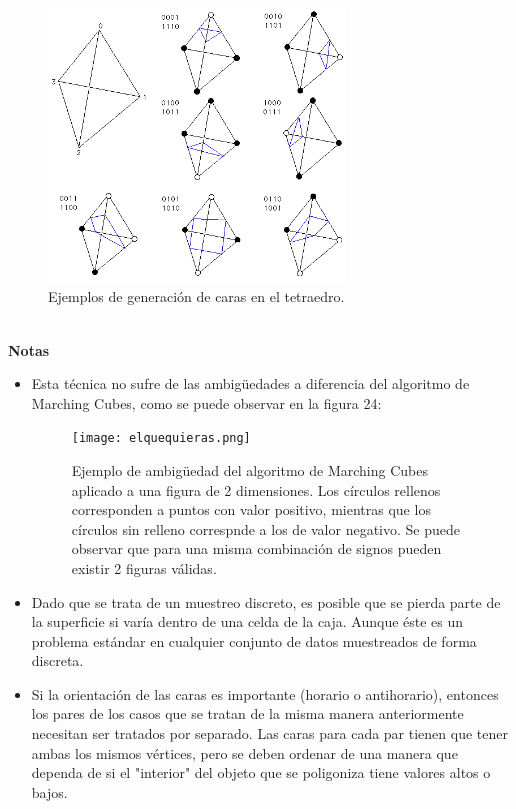 \documentclass[12pt]{article}
\begin{document}
\begin{figure}[h!]
\includegraphics[width=0.7\textwidth,center]{mt2.png}
\caption{Ejemplos de generación de caras en el tetraedro.}
\end{figure}\\
\textbf{Notas}
\begin{itemize}
\item Esta técnica no sufre de las ambigüedades a diferencia del algoritmo de Marching Cubes, como se puede observar en la figura 24:
\begin{figure}[h!]
\texttt{[image: elquequieras.png]}
\caption{Ejemplo de ambigüedad del algoritmo de Marching Cubes aplicado a una figura de 2 dimensiones. Los círculos rellenos corresponden a puntos con valor positivo, mientras que los círculos sin relleno correspnde a los de valor negativo. Se puede observar que para una misma combinación de signos pueden existir 2 figuras válidas.}
\end{figure}
\item Dado que se trata de un muestreo discreto, es posible que se pierda parte de la superficie si varía dentro de una celda de la caja. Aunque éste es un problema estándar en cualquier conjunto de datos muestreados de forma discreta.
\item Si la orientación de las caras es importante (horario o antihorario), entonces los pares de los casos que se tratan de la misma manera anteriormente necesitan ser tratados por separado. Las caras para cada par tienen que tener ambas los mismos vértices, pero se deben ordenar de una manera que dependa de si el "interior" del objeto que se poligoniza tiene valores altos o bajos.
\end{itemize}
\end{document}

